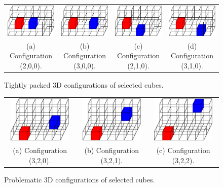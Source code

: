 \begin{figure}
\centering
\begin{tabular}{cccc}
\includegraphics[width=1.2in]{images/config3D_2_0_0.eps} \qquad &
\qquad
\includegraphics[width=1.2in]{images/config3D_3_0_0.eps}
\qquad &
\qquad
\includegraphics[width=1.2in]{images/config3D_2_1_0.eps}
\qquad &
\qquad
\includegraphics[width=1.2in]{images/config3D_3_1_0.eps} \\
(a) Configuration (2,0,0). & (b) Configuration (3,0,0). 
  & (c) Configuration (2,1,0). & (d) Configuration (3,1,0).
\end{tabular}
\caption{Tightly packed 3D configurations of selected cubes.}
\label{fig:packed3D}
\end{figure}

\begin{figure}
\centering
\begin{tabular}{ccc}
\includegraphics[width=1.2in]{images/config3D_3_2_0.eps} \qquad &
\qquad
\includegraphics[width=1.2in]{images/config3D_3_2_1.eps}
\qquad &
\qquad
\includegraphics[width=1.2in]{images/config3D_3_2_2.eps} \\
(a) Configuration (3,2,0). & (b) Configuration (3,2,1). 
  & (c) Configuration (3,2,2).
\end{tabular}
\caption{Problematic 3D configurations of selected cubes.}
\label{fig:loose3D}
\end{figure}

